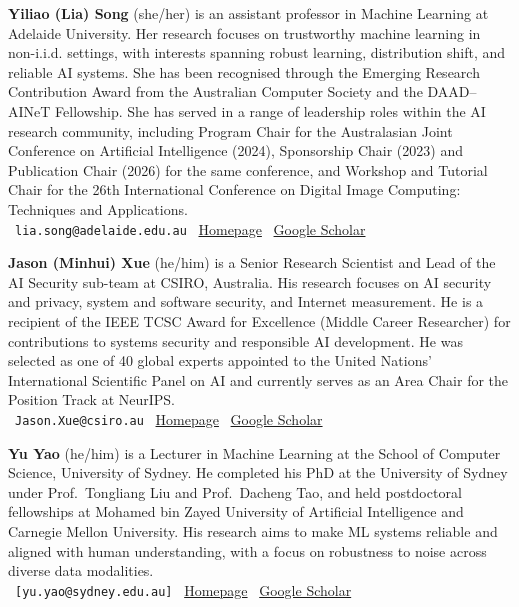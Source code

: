 \documentclass{article}
\newcommand{\orginfo}[3]{\\{\small\faEnvelope\ \texttt{#1} \hfill \faHome\ \href{https://#2}{Homepage} \hfill \faGraduationCap\ \href{https://scholar.google.com/citations?user=#3}{Google Scholar}}}
\begin{document}
\textbf{Yiliao (Lia) Song} (she/her) is an assistant professor in Machine Learning at Adelaide University. Her research focuses on trustworthy machine learning in non-i.i.d. settings, with interests spanning robust learning, distribution shift, and reliable AI systems. She has been recognised through the Emerging Research Contribution Award from the Australian Computer Society and the DAAD–AINeT Fellowship. She has served in a range of leadership roles within the AI research community, including Program Chair for the Australasian Joint Conference on Artificial Intelligence (2024), Sponsorship Chair (2023) and Publication Chair (2026) for the same conference, and Workshop and Tutorial Chair for the 26th International Conference on Digital Image Computing: Techniques and Applications.
\orginfo{lia.song@adelaide.edu.au}{songyiliao.github.io}{lKzKBHUAAAAJ}

\textbf{Jason (Minhui) Xue} (he/him) is a Senior Research Scientist and Lead of the AI Security sub-team at CSIRO, Australia. His research focuses on AI security and privacy, system and software security, and Internet measurement. He is a recipient of the IEEE TCSC Award for Excellence (Middle Career Researcher) for contributions to systems security and responsible AI development. He was selected as one of 40 global experts appointed to the United Nations’ International Scientific Panel on AI and currently serves as an Area Chair for the Position Track at NeurIPS.
\orginfo{Jason.Xue@csiro.au}{https://minhui-xue.github.io/}{[jdqkm1IAAAAJ]}

\textbf{Yu Yao} (he/him) is a Lecturer in Machine Learning at the School of Computer Science, University of Sydney. He completed his PhD at the University of Sydney under Prof.\ Tongliang Liu and Prof.\ Dacheng Tao, and held postdoctoral fellowships at Mohamed bin Zayed University of Artificial Intelligence and Carnegie Mellon University. His research aims to make ML systems reliable and aligned with human understanding, with a focus on robustness to noise across diverse data modalities.
\orginfo{[yu.yao@sydney.edu.au]}{a5507203.github.io}{OkcaMKAAAAAJ}

\end{document}
